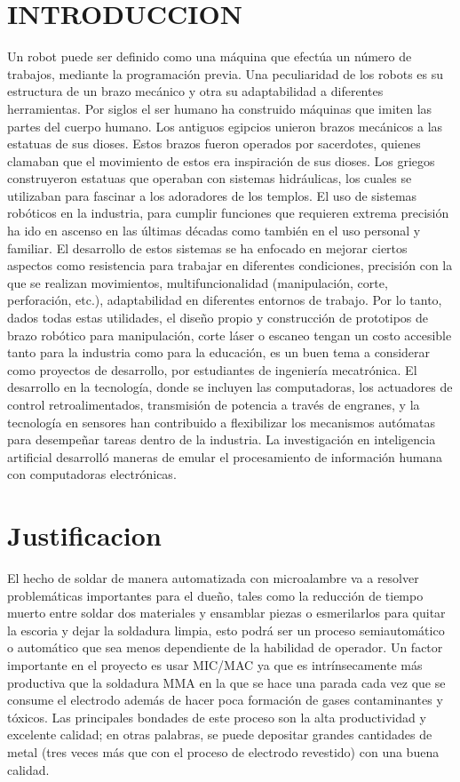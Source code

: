 \documentclass[12pt,letterpaper]{article}
\begin{document}
\section*{INTRODUCCION}
Un robot puede ser definido como una máquina que efectúa un número de trabajos, mediante la programación previa. Una peculiaridad de los robots es su estructura de un brazo mecánico y otra su adaptabilidad a diferentes herramientas.
Por siglos el ser humano ha construido máquinas que imiten las partes del cuerpo humano. Los antiguos egipcios unieron brazos mecánicos a las estatuas de sus dioses. Estos brazos fueron operados por sacerdotes, quienes clamaban que el movimiento de estos era inspiración de sus dioses. Los griegos construyeron estatuas que operaban con sistemas hidráulicas, los cuales se utilizaban para fascinar a los adoradores de los templos.
El uso de sistemas robóticos en la industria, para cumplir funciones que requieren extrema precisión ha ido en ascenso en las últimas décadas como también en el uso personal y familiar.
El desarrollo de estos sistemas se ha enfocado en mejorar ciertos aspectos como resistencia para trabajar en diferentes condiciones, precisión con la que se realizan movimientos, multifuncionalidad (manipulación, corte, perforación, etc.), adaptabilidad en diferentes entornos de trabajo.
Por lo tanto, dados todas estas utilidades, el diseño propio y construcción de prototipos de brazo robótico para manipulación, corte láser o escaneo tengan un costo accesible tanto para la industria como para la educación, es un buen tema a considerar como proyectos de desarrollo, por estudiantes de ingeniería mecatrónica.
El desarrollo en la tecnología, donde se incluyen las computadoras, los actuadores de control retroalimentados, transmisión de potencia a través de engranes, y la tecnología en sensores han contribuido a flexibilizar los mecanismos autómatas para desempeñar tareas dentro de la industria. La investigación en inteligencia artificial desarrolló maneras de emular el procesamiento de información humana con computadoras electrónicas.
\section*{Justificacion}
El hecho de soldar de manera automatizada con microalambre va a resolver problemáticas importantes para el dueño, tales como la reducción de tiempo muerto entre soldar dos materiales y ensamblar piezas o esmerilarlos para quitar la escoria y dejar la soldadura limpia, esto podrá ser un proceso semiautomático o automático que sea menos dependiente de la habilidad de operador.
Un factor importante en el proyecto es usar MIC/MAC ya que es intrínsecamente más productiva que la soldadura MMA en la que se hace una parada cada vez que se consume el electrodo además de hacer poca formación de gases contaminantes y tóxicos.
Las principales bondades de este proceso son la alta productividad y excelente calidad; en otras palabras, se puede depositar grandes cantidades de metal (tres veces más que con el proceso de electrodo revestido) con una buena calidad.
\end{document}
